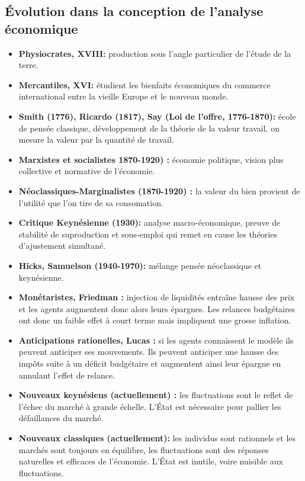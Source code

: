 

\subsection{Évolution dans la conception de l'analyse économique} %
\label{sec:evolution_dans_la_conception_de_l_analyse_economique}

\begin{itemize}[label= ]
	\item \textbf{Physiocrates, XVIII:} production sous l'angle particulier de l'étude de la terre. 
	\item \textbf{Mercantiles, XVI:} étudient les bienfaits économiques du commerce international entre la vieille Europe et le nouveau monde.
	\item \textbf{Smith (1776), Ricardo (1817), Say (Loi de l'offre, 1776-1870):} école de pensée classique, développement de la théorie de la valeur travail, on mesure la valeur par la quantité de travail.
	\item \textbf{Marxistes et socialistes 1870-1920) :} économie politique, vision plus collective et normative de l'économie.
	\item \textbf{Néoclassiques-Marginalistes (1870-1920) :} la valeur du bien provient de l'utilité que l'on tire de sa consomation.
	\item \textbf{Critique Keynésienne (1930):} analyse macro-économique, preuve de stabilité de suproduction et sous-emploi qui remet en cause les théories d'ajustement simultané.
	\item \textbf{Hicks, Samuelson (1940-1970):} mélange pensée néoclassique et keynésienne.
	\item \textbf{Monétaristes, Friedman :} injection de liquidités entraîne hausse des prix et les agents augmentent donc alors leurs épargnes. Les relances budgétaires ont donc un faible effet à court terme mais impliquent une grosse inflation.
	\item \textbf{Anticipations rationelles, Lucas :} si les agents connaissent le modèle ils peuvent anticiper ses mouvements. Ils peuvent anticiper une hausse des impôts suite à un déficit budgétaire et augmentent ainsi leur épargne en annulant l'effet de relance.
	\item \textbf{Nouveaux keynésiens (actuellement) :} les fluctuations sont le reflet de l'échec du marché à grande échelle. L'État est nécessaire pour pallier les défaillances du marché.
	\item \textbf{Nouveaux classiques (actuellement):} les individus sont rationnels et les marchés sont toujours en équilibre, les fluctuations sont des réponses naturelles et efficaces de l'économie. L'État est inutile, voire nuisible aux fluctuations.
\end{itemize}



